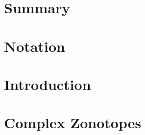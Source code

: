 \documentclass[11pt,a4paper,twoside,openright]{book}
\begin{document}
\pagestyle{empty}


\frontmatter
\pagestyle{plain}

% 
% 
% 
\chapter{Summary} 
% 
% 
\cleardoublepage
{}
\tableofcontents
\listofalgorithms

\chapter*{Notation} 

\mainmatter 
\pagestyle{fancy}

\chapter{Introduction} \label{ch:intro} 
%
% 
\chapter{Complex Zonotopes} \label{ch:tcz} 
%
\end{document}
